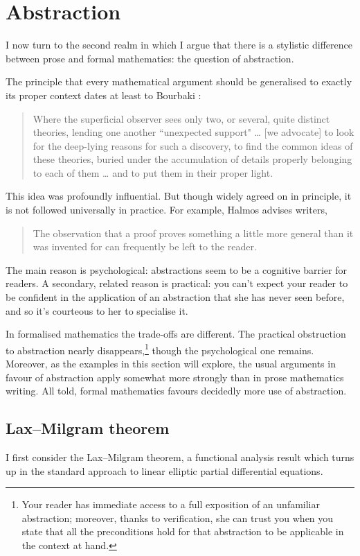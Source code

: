 \documentclass[runningheads]{llncs}
\begin{document}
\section{Abstraction} \label{sec:abstraction}




I now turn to the second realm in which I argue 
that there is a stylistic difference between prose and formal mathematics:
the question of abstraction.

The principle that every mathematical argument should be generalised to exactly its proper context
dates at least to Bourbaki \cite[section 2]{Bou50}:
\begin{quote}
Where the superficial observer sees only two, or several, quite
distinct theories, lending one another ``unexpected support"
\ldots
[we advocate]
to look for the deep-lying reasons for such a discovery, 
to find the common ideas of these theories,
buried under the accumulation of details properly belonging to each of them \ldots
and to put them in their proper light.
\end{quote}
This idea was profoundly influential.
But though widely agreed on in principle,
it is not followed universally in practice.
For example, Halmos \cite{Hal70} advises  writers,
\begin{quote}
  The observation that a proof proves something a little more general than it was invented for can frequently be left to the reader.
\end{quote}
The main reason is psychological:
abstractions seem to be a cognitive barrier for readers.
A secondary, related reason is practical:
you can't expect your reader to be confident in the application of an abstraction
that she has never seen before,
and so it's courteous to her to specialise it.

In formalised mathematics the trade-offs are different.
The practical obstruction to abstraction nearly disappears,\footnote{
Your reader has immediate access to a full exposition of an unfamiliar abstraction;
moreover, thanks to verification, she can trust you
when you state that all the preconditions hold for that abstraction to be applicable in the context at hand.}
though the psychological one remains.
Moreover, as the examples in this section will explore,
the usual arguments in favour of abstraction apply somewhat more strongly than in prose mathematics writing.
All told, formal mathematics favours decidedly more use of abstraction.


\subsection{Lax--Milgram theorem}
%
I first consider the Lax--Milgram theorem,
a functional analysis result
which turns up in the standard approach to linear elliptic partial differential equations.
\end{document}

